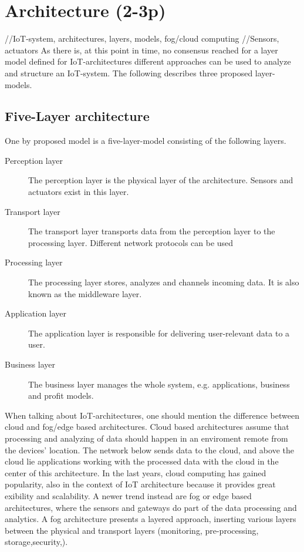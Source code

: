 \section{Architecture (2-3p)}
//IoT-system, architectures, layers, models, fog/cloud computing //Sensors, actuators
As there is, at this point in time, no consensus reached for a
layer model defined for IoT-architectures \parencite{noModel}
different approaches can be used to analyze and structure an IoT-system. 
The following describes three proposed layer-models.

\subsection{Five-Layer architecture}
One by \parencite{fivelayer1,fivelayer2} proposed model is a five-layer-model consisting of the following layers.
\begin{description}
    \item [Perception layer]
    The perception layer is the physical layer of the architecture. Sensors and actuators exist in this layer.
    \item [Transport layer]
     The transport layer transports data from the perception layer to the processing layer. Different network protocols can be used
   \item [Processing layer]
   The processing layer stores, analyzes and channels incoming data. It is also known as the middleware layer.
   \item [Application layer]
   The application layer is responsible for delivering user-relevant data to a user.
   \item [Business layer]
   The business layer manages the whole system, e.g. applications, business and profit models.
\end{description}

When talking about IoT-architectures, one should mention the difference between cloud and fog/edge based architectures. 
Cloud based architectures assume that processing and analyzing of data should happen in an enviroment remote from the devices' location.
The network below sends data to the cloud, and above the cloud lie applications working with the processed data with the cloud in the center of this architecture.
In the last years, cloud computing has gained popularity, also in the context of IoT architecture \parencite{cloudArchIoT} because it provides great exibility and scalability.
A newer trend instead are fog or edge based architectures, where the sensors and gateways do part of the data processing and analytics.
A fog architecture presents a layered approach, inserting various layers between the physical and transport layers (monitoring, pre-processing, storage,security,).


